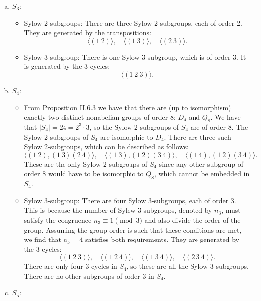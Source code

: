 \documentclass{article}
\begin{document}
\begin{enumerate}[(a)]
    \item $S_3$: 
        \begin{itemize}
            \item Sylow 2-subgroups: There are three Sylow 2-subgroups, each of order 2. They are generated by the transpositions:
            \[
                \langle (1\ 2) \rangle, \quad \langle (1\ 3) \rangle, \quad \langle (2\ 3) \rangle.
            \]
            \item Sylow 3-subgroup: There is one Sylow 3-subgroup, which is of order 3. It is generated by the 3-cycles:
            \[
                \langle (1\ 2\ 3) \rangle.
            \]
        \end{itemize}
    \item $S_4$:
        \begin{itemize}
            \item From Proposition II.6.3 we have that there are (up to isomorphism) exactly two distinct nonabelian groups of order 8: $D_4$ and $Q_8$. We have that $|S_4| = 24 = 2^3 \cdot 3$, so the Sylow 2-subgroups of $S_4$ are of order 8. The Sylow 2-subgroups of $S_4$ are isomorphic to $D_4$. There are three such Sylow 2-subgroups, which can be described as follows:
            \[
                \langle (1\ 2), (1\ 3)(2\ 4) \rangle, \quad \langle (1\ 3), (1\ 2)(3\ 4) \rangle, \quad \langle (1\ 4), (1\ 2)(3\ 4) \rangle.
            \]
            These are the only Sylow 2-subgroups of $S_4$ since any other subgroup of order 8 would have to be isomorphic to $Q_8$, which cannot be embedded in $S_4$.
            \\
            \item Sylow 3-subgroup: There are four Sylow 3-subgroups, each of order 3. This is because the number of Sylow 3-subgroups, denoted by $n_3$, must satisfy the congruence $n_3 \equiv 1 \pmod{3}$ and also divide the order of the group. Assuming the group order is such that these conditions are met, we find that $n_3 = 4$ satisfies both requirements. They are generated by the 3-cycles:
            \[
                \langle (1\ 2\ 3) \rangle, \quad \langle (1\ 2\ 4) \rangle, \quad \langle (1\ 3\ 4) \rangle, \quad \langle (2\ 3\ 4) \rangle.
            \]
            There are only four 3-cycles in $S_4$, so these are all the Sylow 3-subgroups. There are no other subgroups of order 3 in $S_4$.
            \\
        \end{itemize}
    \item $S_5$:

\end{enumerate}
\end{document}
